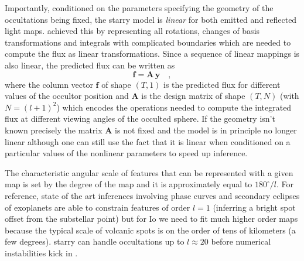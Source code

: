 \documentclass[modern]{aastex62}
\begin{document}
Importantly, conditioned on the parameters specifying the geometry of the occultations being fixed, the \textsf{starry} model is \emph{linear} for both emitted and reflected light maps.
\cite{luger2019} achieved this by representing all rotations, changes of basis transformations and integrals with complicated boundaries which are needed to compute the flux as linear transformations.
Since a sequence of linear mappings is also linear, the predicted flux can be written as
\begin{equation}
    \mathbf{f}=\mathbf{A}\,\mathbf{y}
    \quad,
    \label{eq:linear_model}
\end{equation}
where the column vector $\mathbf{f}$ of shape $(T, 1)$ is the predicted flux for different values of the occultor position and $\mathbf{A}$ is the design matrix \citep[see appendix B.1. in ][]{luger2021a} of shape $(T, N)$ (with $N=(l+1)^2$) which encodes the operations needed to compute the integrated flux at different viewing angles of the occulted sphere.
If the geometry isn't known precisely the matrix $\mathbf{A}$ is not fixed and the model is in principle no longer linear although one can still use the fact that it is linear when conditioned on a particular values of the nonlinear parameters to speed up inference.

The characteristic angular scale of features that can be represented with a given map is set by the degree of the map and it is approximately equal to $180^\circ/l$.
For reference, state of the art inferences involving phase curves and secondary eclipses of exoplanets are able to constrain features of order $l=1$ (inferring a bright spot offset from the substellar point) but for Io we need to fit much higher order maps because the typical scale of volcanic spots is on the order of tens of kilometers (a few degrees).
\textsf{starry} can handle occultations up to $l\approx 20$ before numerical instabilities kick in \citep{luger2019a}.
\end{document}
